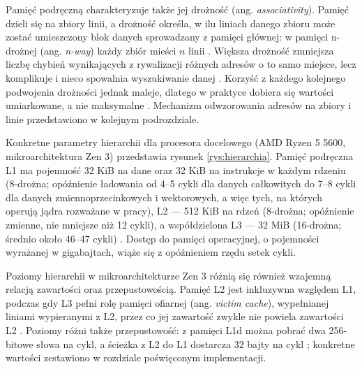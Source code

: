 \documentclass[a4paper,12pt]{book} %
\begin{document}
Pamięć podręczną charakteryzuje także jej drożność (ang. \emph{associativity}). Pamięć dzieli się na zbiory linii, a drożność określa, w ilu liniach danego zbioru może zostać umieszczony blok danych sprowadzany z pamięci głównej: w pamięci n-drożnej (ang. \emph{n-way}) każdy zbiór mieści $n$ linii \cite{gottlieb_arch_lec22}. Większa drożność zmniejsza liczbę chybień wynikających z rywalizacji różnych adresów o to samo miejsce, lecz komplikuje i nieco spowalnia wyszukiwanie danej \cite{hennessy2017architecture}. Korzyść z każdego kolejnego podwojenia drożności jednak maleje, dlatego w praktyce dobiera się wartości umiarkowane, a nie maksymalne \cite{hill1989associativity}. Mechanizm odwzorowania adresów na zbiory i linie przedstawiono w kolejnym podrozdziale.

Konkretne parametry hierarchii dla procesora docelowego (AMD Ryzen 5 5600, mikroarchitektura Zen 3) przedstawia rysunek \ref{rys:hierarchia}. Pamięć podręczna L1 ma pojemność 32 KiB na dane oraz 32 KiB na instrukcje w każdym rdzeniu (8-drożna; opóźnienie ładowania od 4--5 cykli dla danych całkowitych do 7--8 cykli dla danych zmiennoprzecinkowych i wektorowych, a więc tych, na których operują jądra rozważane w pracy), L2 --- 512 KiB na rdzeń (8-drożna; opóźnienie zmienne, nie mniejsze niż 12 cykli), a współdzielona L3 --- 32 MiB (16-drożna; średnio około 46--47 cykli) \cite{amd_sog_19h,fog_microarchitecture}. Dostęp do pamięci operacyjnej, o pojemności wyrażanej w gigabajtach, wiąże się z opóźnieniem rzędu setek cykli.

Poziomy hierarchii w mikroarchitekturze Zen 3 różnią się również wzajemną relacją zawartości oraz przepustowością. Pamięć L2 jest inkluzywna względem L1, podczas gdy L3 pełni rolę pamięci ofiarnej (ang. \emph{victim cache}), wypełnianej liniami wypieranymi z L2, przez co jej zawartość zwykle nie powiela zawartości L2 \cite{amd_sog_19h}. Poziomy różni także przepustowość: z pamięci L1d można pobrać dwa 256-bitowe słowa na cykl, a ścieżka z L2 do L1 dostarcza 32 bajty na cykl \cite{amd_sog_19h,fog_microarchitecture}; konkretne wartości zestawiono w rozdziale poświęconym implementacji.
\end{document}
